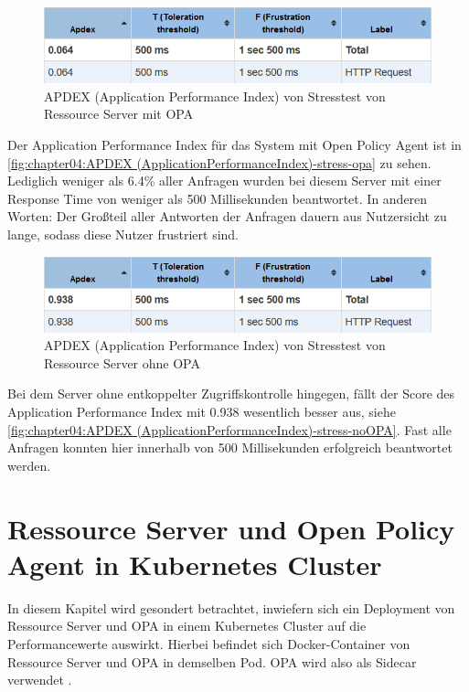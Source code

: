 \begin{figure}[H]
  \centering
  \includegraphics[width=1.0\textwidth]{gfx/APDEX (Application Performance Index)-stress-opa.png}
  \caption{APDEX (Application Performance Index) von Stresstest von Ressource Server mit OPA}
  \label{fig:chapter04:APDEX (ApplicationPerformanceIndex)-stress-opa}
\end{figure}

Der Application Performance Index für das System mit Open Policy Agent ist in \autoref{fig:chapter04:APDEX (ApplicationPerformanceIndex)-stress-opa} zu sehen. Lediglich weniger als 6.4\% aller Anfragen wurden bei diesem Server mit einer Response Time von weniger als 500 Millisekunden beantwortet. In anderen Worten: Der Großteil aller Antworten der Anfragen dauern aus Nutzersicht zu lange, sodass diese Nutzer frustriert sind.

\begin{figure}[H]
  \centering
  \includegraphics[width=1.0\textwidth]{gfx/APDEX (Application Performance Index)-stress-noOPA.png}
  \caption{APDEX (Application Performance Index) von Stresstest von Ressource Server ohne OPA}
  \label{fig:chapter04:APDEX (ApplicationPerformanceIndex)-stress-noOPA}
\end{figure}

Bei dem Server ohne entkoppelter Zugriffskontrolle hingegen, fällt der Score des Application Performance Index mit 0.938 wesentlich besser aus, siehe \autoref{fig:chapter04:APDEX (ApplicationPerformanceIndex)-stress-noOPA}. Fast alle Anfragen konnten hier innerhalb von 500 Millisekunden erfolgreich beantwortet werden. 

\section{Ressource Server und Open Policy Agent in Kubernetes Cluster}

In diesem Kapitel wird gesondert betrachtet, inwiefern sich ein Deployment von Ressource Server und OPA in einem Kubernetes Cluster auf die Performancewerte auswirkt. Hierbei befindet sich Docker-Container von Ressource Server und OPA in demselben Pod. OPA wird also als Sidecar verwendet \citep{sidecar:2017}. 

